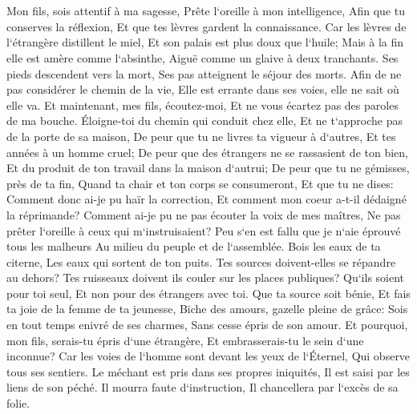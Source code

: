 \chapter{}

\verse Mon fils, sois attentif à ma sagesse, Prête l`oreille à mon intelligence, 
\verse Afin que tu conserves la réflexion, Et que tes lèvres gardent la connaissance. 
\verse Car les lèvres de l`étrangère distillent le miel, Et son palais est plus doux que l`huile; 
\verse Mais à la fin elle est amère comme l`absinthe, Aiguë comme un glaive à deux tranchants. 
\verse Ses pieds descendent vers la mort, Ses pas atteignent le séjour des morts. 
\verse Afin de ne pas considérer le chemin de la vie, Elle est errante dans ses voies, elle ne sait où elle va. 
\verse Et maintenant, mes fils, écoutez-moi, Et ne vous écartez pas des paroles de ma bouche. 
\verse Éloigne-toi du chemin qui conduit chez elle, Et ne t`approche pas de la porte de sa maison, 
\verse De peur que tu ne livres ta vigueur à d`autres, Et tes années à un homme cruel; 
\verse De peur que des étrangers ne se rassasient de ton bien, Et du produit de ton travail dans la maison d`autrui; 
\verse De peur que tu ne gémisses, près de ta fin, Quand ta chair et ton corps se consumeront, 
\verse Et que tu ne dises: Comment donc ai-je pu haïr la correction, Et comment mon coeur a-t-il dédaigné la réprimande? 
\verse Comment ai-je pu ne pas écouter la voix de mes maîtres, Ne pas prêter l`oreille à ceux qui m`instruisaient? 
\verse Peu s`en est fallu que je n`aie éprouvé tous les malheurs Au milieu du peuple et de l`assemblée. 
\verse Bois les eaux de ta citerne, Les eaux qui sortent de ton puits. 
\verse Tes sources doivent-elles se répandre au dehors? Tes ruisseaux doivent ils couler sur les places publiques? 
\verse Qu`ils soient pour toi seul, Et non pour des étrangers avec toi. 
\verse Que ta source soit bénie, Et fais ta joie de la femme de ta jeunesse, 
\verse Biche des amours, gazelle pleine de grâce: Sois en tout temps enivré de ses charmes, Sans cesse épris de son amour. 
\verse Et pourquoi, mon fils, serais-tu épris d`une étrangère, Et embrasserais-tu le sein d`une inconnue? 
\verse Car les voies de l`homme sont devant les yeux de l`Éternel, Qui observe tous ses sentiers. 
\verse Le méchant est pris dans ses propres iniquités, Il est saisi par les liens de son péché. 
\verse Il mourra faute d`instruction, Il chancellera par l`excès de sa folie. 

\chapter{}

